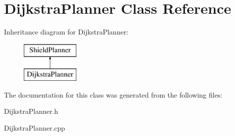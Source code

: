 \hypertarget{class_dijkstra_planner}{}\section{Dijkstra\+Planner Class Reference}
\label{class_dijkstra_planner}
Inheritance diagram for Dijkstra\+Planner\+:\begin{figure}[H]
\begin{center}
\leavevmode
\includegraphics[height=2.000000cm]{class_dijkstra_planner}
\end{center}
\end{figure}


The documentation for this class was generated from the following files\+:\begin{DoxyCompactItemize}
\item 
Dijkstra\+Planner.\+h\item 
Dijkstra\+Planner.\+cpp\end{DoxyCompactItemize}
